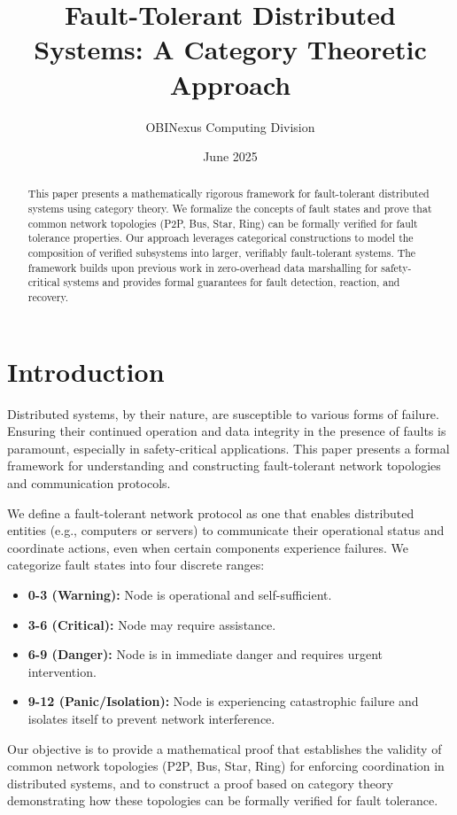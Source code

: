 \documentclass{article}
\title{Fault-Tolerant Distributed Systems: A Category Theoretic Approach}
\author{OBINexus Computing Division}
\date{June 2025}
\begin{document}
\maketitle

\begin{abstract}
This paper presents a mathematically rigorous framework for fault-tolerant distributed systems using category theory. We formalize the concepts of fault states and prove that common network topologies (P2P, Bus, Star, Ring) can be formally verified for fault tolerance properties. Our approach leverages categorical constructions to model the composition of verified subsystems into larger, verifiably fault-tolerant systems. The framework builds upon previous work in zero-overhead data marshalling for safety-critical systems and provides formal guarantees for fault detection, reaction, and recovery.
\end{abstract}

\section{Introduction}

Distributed systems, by their nature, are susceptible to various forms of failure. Ensuring their continued operation and data integrity in the presence of faults is paramount, especially in safety-critical applications. This paper presents a formal framework for understanding and constructing fault-tolerant network topologies and communication protocols.

We define a fault-tolerant network protocol as one that enables distributed entities (e.g., computers or servers) to communicate their operational status and coordinate actions, even when certain components experience failures. We categorize fault states into four discrete ranges:

\begin{itemize}
\item \textbf{0-3 (Warning):} Node is operational and self-sufficient.
\item \textbf{3-6 (Critical):} Node may require assistance.
\item \textbf{6-9 (Danger):} Node is in immediate danger and requires urgent intervention.
\item \textbf{9-12 (Panic/Isolation):} Node is experiencing catastrophic failure and isolates itself to prevent network interference.
\end{itemize}

Our objective is to provide a mathematical proof that establishes the validity of common network topologies (P2P, Bus, Star, Ring) for enforcing coordination in distributed systems, and to construct a proof based on category theory demonstrating how these topologies can be formally verified for fault tolerance.
\end{document}
